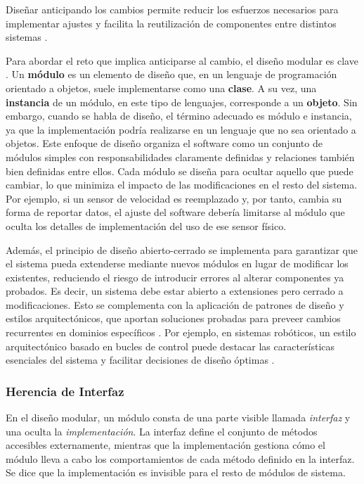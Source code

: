 Diseñar anticipando los cambios permite reducir los esfuerzos necesarios para implementar ajustes y facilita la reutilización de componentes entre distintos sistemas \cite{Parnas02, DBLP:books/daglib/0019719}.

Para abordar el reto que implica anticiparse al cambio, el diseño modular es clave \cite{Parnas1972}.
Un \textbf{módulo} es un elemento de diseño que, en un lenguaje de programación orientado a objetos, suele implementarse como una \textbf{clase}. A su vez, una \textbf{instancia} de un módulo, en este tipo de lenguajes, corresponde a un \textbf{objeto}. Sin embargo, cuando se habla de diseño, el término adecuado es módulo e instancia, ya que la implementación podría realizarse en un lenguaje que no sea orientado a objetos. Este enfoque de diseño organiza el software como un conjunto de módulos simples con responsabilidades claramente definidas y relaciones también bien definidas entre ellos. Cada módulo se diseña para ocultar aquello que puede cambiar, lo que minimiza el impacto de las modificaciones en el resto del sistema. Por ejemplo, si un sensor de velocidad es reemplazado y, por tanto, cambia su forma de reportar datos, el ajuste del software debería limitarse al módulo que oculta los detalles de implementación del uso de ese sensor físico.

Además, el principio de diseño abierto-cerrado \cite{DBLP:books/ph/Meyer97} se implementa para garantizar que el sistema pueda extenderse mediante nuevos módulos en lugar de modificar los existentes, reduciendo el riesgo de introducir errores al alterar componentes ya probados. Es decir, un sistema debe estar abierto a extensiones pero cerrado a modificaciones. Esto se complementa con la aplicación de patrones de diseño y estilos arquitectónicos, que aportan soluciones probadas para preveer cambios recurrentes en dominios específicos \cite{Gamma:1995:DPE:186897, DBLP:books/lib/BuschmannHS07}. Por ejemplo, en sistemas robóticos, un estilo arquitectónico basado en bucles de control puede destacar las características esenciales del sistema y facilitar decisiones de diseño óptimas \cite{ShawGarlan1996}.

\subsubsection*{Herencia de Interfaz}
En el diseño modular, un módulo consta de una parte visible llamada \textit{interfaz} y una oculta la \textit{implementación}. La interfaz define el conjunto de métodos accesibles externamente, mientras que la implementación gestiona cómo el módulo lleva a cabo los comportamientos de cada método definido en la interfaz. Se dice que la implementación es invisible para el resto de módulos de sistema.


